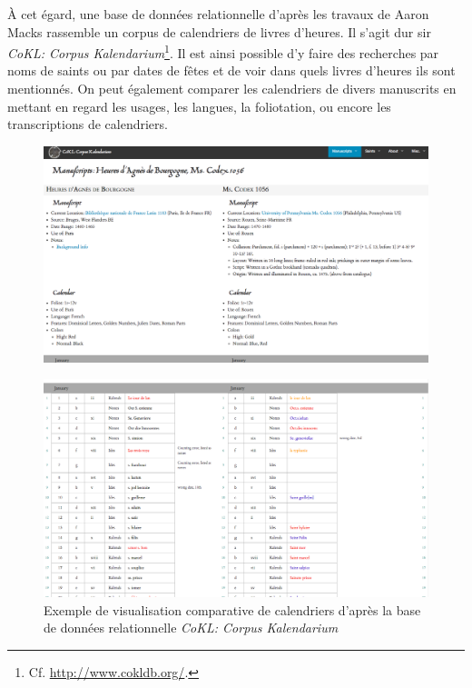 \documentclass[a4paper,12pt,twoside]{book}
\begin{document}
    À cet égard, une base de données relationnelle d'après les travaux de Aaron Macks rassemble un corpus de calendriers de livres d’heures. Il s'agit dur sir \textit{CoKL: Corpus Kalendarium}\footnote{Cf. \url{http://www.cokldb.org/}.}. Il est ainsi possible d'y faire des recherches par noms de saints ou par dates de fêtes et de voir dans quels livres d’heures ils sont mentionnés. On peut également comparer les calendriers de divers manuscrits en mettant en regard les usages, les langues, la foliotation, ou encore les transcriptions de calendriers.
    
    \begin{figure}[!h]
    \centering
    \includegraphics[width=13cm]{img/DataViz/CoKL1.png}
    \end{figure}
    
    \begin{figure}[!h]
    \centering
    \includegraphics[width=13cm]{img/DataViz/CoKL2.png}
    \caption{Exemple de visualisation comparative de calendriers d'après la base de données relationnelle \textit{CoKL: Corpus Kalendarium}}
    \end{figure}
    
\end{document}

